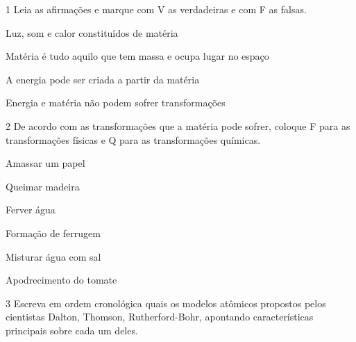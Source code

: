 \num{1}  Leia as afirmações e marque com V as verdadeiras e com F as falsas.

\begin{boxlist}
 Luz, som e calor constituídos de matéria

 Matéria é tudo aquilo que tem massa e ocupa lugar no espaço

 A energia pode ser criada a partir da matéria

 Energia e matéria não podem sofrer transformações
\end{boxlist}


\num{2}  De acordo com as transformações que a matéria pode sofrer, coloque F para as transformações físicas e Q para as transformações químicas.

\begin{boxlist}
 Amassar um papel

 Queimar madeira

 Ferver água

 Formação de ferrugem

 Misturar água com sal

 Apodrecimento do tomate
\end{boxlist}

\num{3} Escreva em ordem cronológica quais os modelos atômicos propostos pelos cientistas Dalton, Thomson, Rutherford-Bohr, apontando características principais sobre cada um deles.



